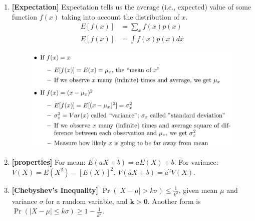 \documentclass[a4paper]{article}
\begin{document}
\begin{enumerate}
\item
\textbf{[Expectation]}
Expectation tells us the average (i.e., expected) value of some function $f(x)$ taking into account the distribution of $x$.
\[
\begin{split}
    E [ f ( x ) ] &= \sum _ { x } f ( x ) p ( x ) \\
    E [ f ( x ) ] &= \int f ( x ) p ( x ) d x
\end{split}
\]
\begin{figure}[h]
    \centering
    \includegraphics[scale = 0.2]{expectation.png}
\end{figure}

\item
\textbf{[properties]}
For mean: $E ( a X + b ) = a E ( X ) + b$. For variance: $V ( X ) = E \left( X ^ { 2 } \right) - [ E ( X ) ] ^ { 2 }$, $V ( a X + b ) = a ^ { 2 } V ( X )$.

\item
\textbf{[Chebyshev’s Inequality]}
$\operatorname { Pr } ( | X - \mu | > k \sigma ) \leq \frac{1}{ k ^ { 2 }}$, given mean $\mu$ and variance $\sigma$ for a random variable, and $\mathbf{k > 0}$. Another form is $\operatorname { Pr } ( | X - \mu | \leq k \sigma ) \geq 1 - \frac{1}{ k ^ { 2 }}$.

\end{enumerate}
\end{document}
